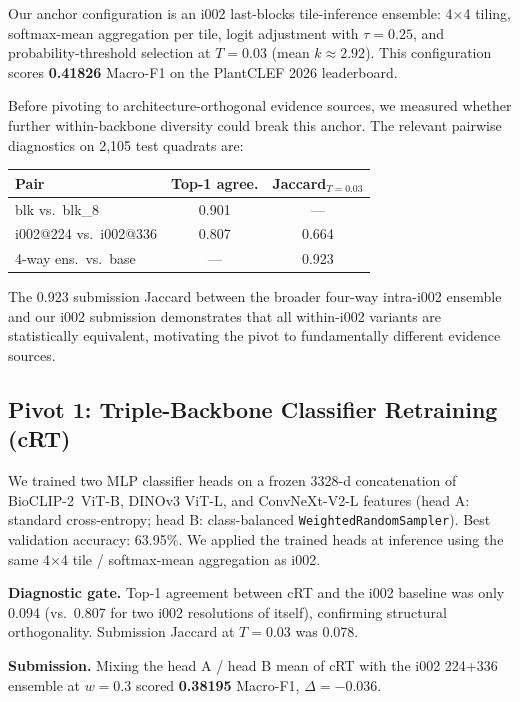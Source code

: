 \documentclass[10pt,twocolumn,letterpaper]{article}
\begin{document}
Our anchor configuration is an i002 last-blocks tile-inference ensemble: 4$\times$4 tiling, softmax-mean aggregation per tile, logit adjustment with $\tau{=}0.25$, and probability-threshold selection at $T{=}0.03$ (mean $k\!\approx\!2.92$). This configuration scores \textbf{0.41826} Macro-F1 on the PlantCLEF 2026 leaderboard.

Before pivoting to architecture-orthogonal evidence sources, we measured whether further within-backbone diversity could break this anchor. The relevant pairwise diagnostics on 2{,}105 test quadrats are:

\begin{table}[ht]
\centering
\small
\begin{tabular}{lcc}
\toprule
Pair & Top-1 agree. & Jaccard$_{T{=}0.03}$ \\
\midrule
blk vs.\ blk\_8 & 0.901 & --- \\
i002@224 vs.\ i002@336 & 0.807 & 0.664 \\
4-way ens.\ vs.\ base & --- & 0.923 \\
\bottomrule
\end{tabular}
\end{table}

The 0.923 submission Jaccard between the broader four-way intra-i002 ensemble and our i002 submission demonstrates that all within-i002 variants are statistically equivalent, motivating the pivot to fundamentally different evidence sources.

\subsection{Pivot 1: Triple-Backbone Classifier Retraining (cRT)}

We trained two MLP classifier heads on a frozen 3328-d concatenation of \mbox{BioCLIP-2 ViT-B}, DINOv3 ViT-L, and ConvNeXt-V2-L features (head A: standard cross-entropy; head B: class-balanced \texttt{WeightedRandomSampler}). Best validation accuracy: 63.95\%. We applied the trained heads at inference using the same 4$\times$4 tile / softmax-mean aggregation as i002.

\textbf{Diagnostic gate.} Top-1 agreement between cRT and the i002 baseline was only 0.094 (vs.\ 0.807 for two i002 resolutions of itself), confirming structural orthogonality. Submission Jaccard at $T{=}0.03$ was 0.078.

\textbf{Submission.} Mixing the head A / head B mean of cRT with the i002 224+336 ensemble at $w{=}0.3$ scored \textbf{0.38195} Macro-F1, $\Delta = -0.036$.
\end{document}
